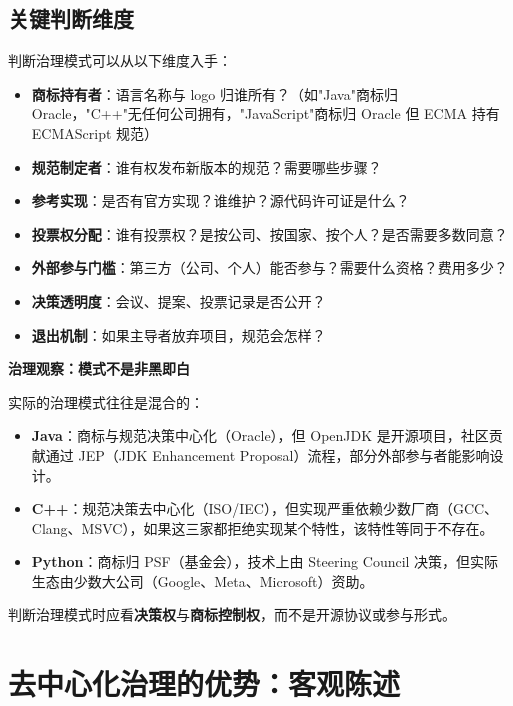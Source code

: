 \documentclass[12pt,a4paper,fontset=fandol]{ctexbook}
\begin{document}
\section{关键判断维度}

判断治理模式可以从以下维度入手：

\begin{itemize}
  \item \textbf{商标持有者}：语言名称与 logo 归谁所有？（如"Java"商标归 Oracle，"C++"无任何公司拥有，"JavaScript"商标归 Oracle 但 ECMA 持有 ECMAScript 规范）
  \item \textbf{规范制定者}：谁有权发布新版本的规范？需要哪些步骤？
  \item \textbf{参考实现}：是否有官方实现？谁维护？源代码许可证是什么？
  \item \textbf{投票权分配}：谁有投票权？是按公司、按国家、按个人？是否需要多数同意？
  \item \textbf{外部参与门槛}：第三方（公司、个人）能否参与？需要什么资格？费用多少？
  \item \textbf{决策透明度}：会议、提案、投票记录是否公开？
  \item \textbf{退出机制}：如果主导者放弃项目，规范会怎样？
\end{itemize}

\begin{govbox}
\textbf{治理观察：模式不是非黑即白}

实际的治理模式往往是混合的：

\begin{itemize}
  \item \textbf{Java}：商标与规范决策中心化（Oracle），但 OpenJDK 是开源项目，社区贡献通过 JEP（JDK Enhancement Proposal）流程，部分外部参与者能影响设计。
  \item \textbf{C++}：规范决策去中心化（ISO/IEC），但实现严重依赖少数厂商（GCC、Clang、MSVC），如果这三家都拒绝实现某个特性，该特性等同于不存在。
  \item \textbf{Python}：商标归 PSF（基金会），技术上由 Steering Council 决策，但实际生态由少数大公司（Google、Meta、Microsoft）资助。
\end{itemize}

判断治理模式时应看\textbf{决策权}与\textbf{商标控制权}，而不是开源协议或参与形式。
\end{govbox}

\chapter{去中心化治理的优势：客观陈述}
\end{document}
